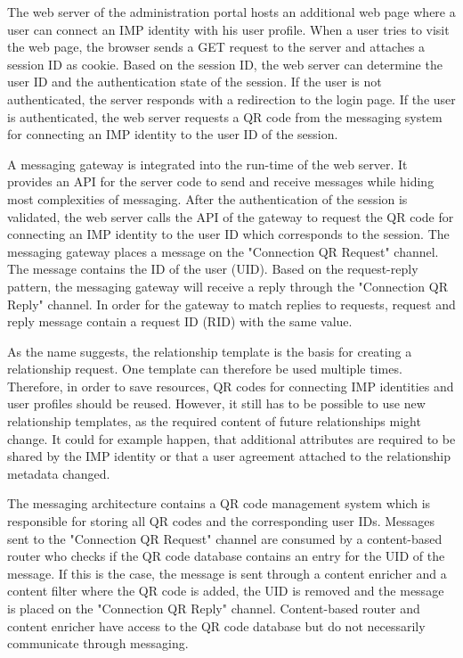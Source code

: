 \documentclass[
     12pt,         %
     a4paper,      %
     BCOR=10mm,version=first,     %
     DIV=14,version=first,        %
     ]{scrreprt}
\begin{document}
The web server of the administration portal hosts an additional web page where a user can connect an IMP identity with his user profile. When a user tries to visit the web page, the browser sends a GET request to the server and attaches a session ID as cookie. Based on the session ID, the web server can determine the user ID and the authentication state of the session. If the user is not authenticated, the server responds with a redirection to the login page. If the user is authenticated, the web server requests a QR code from the messaging system for connecting an IMP identity to the user ID of the session.

A messaging gateway is integrated into the run-time of the web server. It provides an API for the server code to send and receive messages while hiding most complexities of messaging. After the authentication of the session is validated, the web server calls the API of the gateway to request the QR code for connecting an IMP identity to the user ID which corresponds to the session. The messaging gateway places a message on the "Connection QR Request" channel. The message contains the ID of the user (UID). Based on the request-reply pattern, the messaging gateway will receive a reply through the "Connection QR Reply" channel. In order for the gateway to match replies to requests, request and reply message contain a request ID (RID) with the same value.






As the name suggests, the relationship template is the basis for creating a relationship request. One template can therefore be used multiple times. Therefore, in order to save resources, QR codes for connecting IMP identities and user profiles should be reused. However, it still has to be possible to use new relationship templates, as the required content of future relationships might change. It could for example happen, that additional attributes are required to be shared by the IMP identity or that a user agreement attached to the relationship metadata changed.

The messaging architecture contains a QR code management system which is responsible for storing all QR codes and the corresponding user IDs. Messages sent to the "Connection QR Request" channel are consumed by a content-based router who checks if the QR code database contains an entry for the UID of the message. If this is the case, the message is sent through a content enricher and a content filter where the QR code is added, the UID is removed and the message is placed on the "Connection QR Reply" channel. Content-based router and content enricher have access to the QR code database but do not necessarily communicate through messaging.
\end{document}
